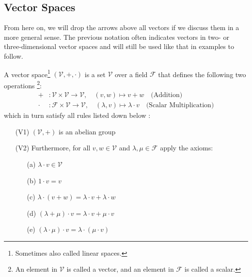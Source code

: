 \subsection{Vector Spaces}\label{subsec-vector-spaces}

\begin{flushleft}
	From here on, we will drop the arrows above all vectors if we discuss them
	in a more general sense. The previous notation often indicates vectors in
	two- or three-dimensional vector spaces and will still be used like that in
	examples to follow.
\end{flushleft}

\begin{definition}\label{def-vector-space}
	A vector space\footnote{Sometimes also called linear spaces.}
	$(\mathcal{V},+,\cdot)$ is a set $\mathcal{V}$ over a field $\mathcal{F}$
	that defines the following two operations \footnote{An element in $\mathcal{V}$
		is called a vector, and an element in $\mathcal{F}$ is called a scalar.}:
	\begin{align}
		+     & :\mathcal{V}\times\mathcal{V}\rightarrow\mathcal{V},\quad(v,w)\mapsto v+w\quad\text{(Addition)}\label{def-vector-addition}                                           \\
		\cdot & :\mathcal{F}\times\mathcal{V}\rightarrow\mathcal{V},\quad(\lambda,v)\mapsto\lambda\cdot v\quad\text{(Scalar Multiplication)}\label{def-vector-scalar-multiplication}
	\end{align}
	which in turn satisfy all rules listed down below
	\cite[p.119]{liesenMehrmann2015}:
	\begin{enumerate}
		\item[(V1)] $(\mathcal{V},+)$ is an abelian group
		\item[(V2)] Furthermore, for all $v,w\in\mathcal{V}$ and $\lambda,\mu\in\mathcal{F}$ apply the axioms:
			\begin{enumerate}
				\item[(a)] $\lambda\cdot v\in\mathcal{V}$
				\item[(b)] $1\cdot v=v$
				\item[(c)] $\lambda\cdot(v+w)=\lambda\cdot v +\lambda\cdot w$
				\item[(d)] $(\lambda+\mu)\cdot v=\lambda\cdot v +\mu\cdot v$
				\item[(e)] $(\lambda\cdot\mu)\cdot v=\lambda\cdot(\mu\cdot v)$
			\end{enumerate}
	\end{enumerate}
\end{definition}

